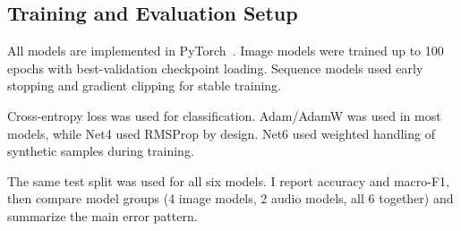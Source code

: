 \subsection{Training and Evaluation Setup}

All models are implemented in PyTorch~\cite{paszke2019pytorch}. Image models were trained up to 100 epochs with best-validation checkpoint loading. Sequence models used early stopping and gradient clipping for stable training.

Cross-entropy loss was used for classification. Adam/AdamW was used in most models, while Net4 used RMSProp by design. Net6 used weighted handling of synthetic samples during training.

The same test split was used for all six models. I report accuracy and macro-F1, then compare model groups (4 image models, 2 audio models, all 6 together) and summarize the main error pattern.